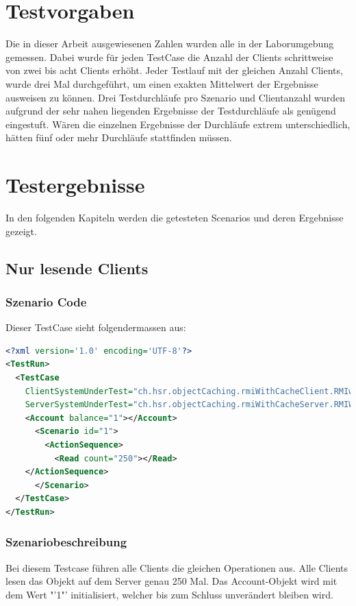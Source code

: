 \section{Testvorgaben}
Die in dieser Arbeit ausgewiesenen Zahlen wurden alle in der La\-bor\-um\-gebung ge\-mes\-sen. Dabei wurde für jeden Test\-Case die An\-zahl der Clients schritt\-weise von zwei bis acht Clients erhöht. Jeder Test\-lauf mit der gleichen Anzahl Clients, wurde drei Mal durchgeführt, um einen exakten Mittel\-wert der Er\-geb\-nis\-se aus\-weisen zu können. Drei Test\-durchläufe pro Szenario und Clientanzahl wurden aufgrund der sehr nahen liegenden Er\-geb\-nis\-se der Testdurchläufe als genügend eingestuft. Wären die einzelnen Ergebnisse der Durchläufe extrem unterschiedlich, hätten fünf oder mehr Durchläufe stattfinden müssen.

\section{Testergebnisse}
In den folgenden Kapiteln werden die getesteten Scenarios und deren Ergebnisse gezeigt. 

\subsection{Nur lesende Clients}
\subsubsection{Szenario Code}
Dieser TestCase sieht folgendermassen aus:
\begin{lstlisting}[language=XML, breaklines=true]
<?xml version='1.0' encoding='UTF-8'?>
<TestRun>
  <TestCase
    ClientSystemUnderTest="ch.hsr.objectCaching.rmiWithCacheClient.RMIwithCacheClientSystem"
    ServerSystemUnderTest="ch.hsr.objectCaching.rmiWithCacheServer.RMIWithCacheServerSystem">
    <Account balance="1"></Account>
      <Scenario id="1">
        <ActionSequence>
          <Read count="250"></Read>
	</ActionSequence>
      </Scenario>
  </TestCase>
</TestRun>
\end{lstlisting}

\subsubsection{Szenariobeschreibung}
Bei diesem Testcase führen alle Clients die gleichen Operationen aus. Alle Clients lesen das Objekt auf dem Server genau 250 Mal. Das Account-Objekt wird mit dem Wert "'1"' initialisiert, welcher bis zum Schluss unverändert bleiben wird. 


